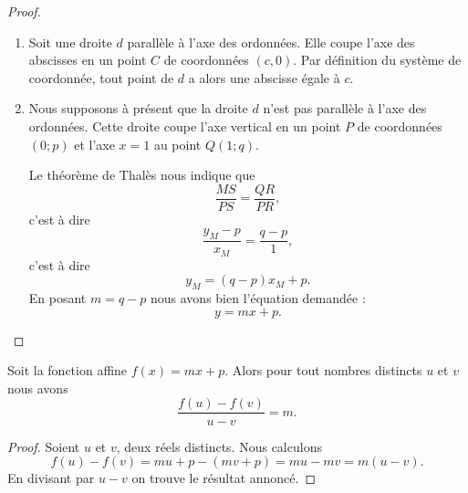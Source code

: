 \begin{proof}
    \begin{enumerate}
        \item
            Soit une droite \( d\) parallèle à l'axe des ordonnées. Elle coupe l'axe des abscisses en un point \( C\) de coordonnées \( (c,0)\). Par définition du système de coordonnée, tout point de \( d\) a alors une abscisse égale à \( c\).
        \item
            Nous supposons à présent que la droite \( d\) n'est pas parallèle à l'axe des ordonnées. Cette droite coupe l'axe vertical en un point \( P\) de coordonnées \( (0;p)\) et l'axe \( x=1\) au point \( Q(1;q)\).
            \begin{center}
   
            \end{center}
            Le théorème de Thalès nous indique que
            \begin{equation}
                \frac{ MS }{ PS }=\frac{ QR }{ PR },
            \end{equation}
            c'est à dire
            \begin{equation}
                \frac{ y_M-p }{ x_M }=\frac{ q-p }{ 1 },
            \end{equation}
            c'est à dire
            \begin{equation}
                y_M=(q-p)x_M+p.
            \end{equation}
            En posant \( m=q-p\) nous avons bien l'équation demandée :
            \begin{equation}
                y=mx+p.
            \end{equation}
    \end{enumerate}
\end{proof}

\begin{theorem}
    Soit la fonction affine \( f(x)=mx+p\). Alors pour tout nombres distincts \( u\) et \( v\) nous avons
    \begin{equation}
        \frac{ f(u)-f(v) }{ u-v }=m.
    \end{equation}
\end{theorem}

\begin{proof}
    Soient \( u\) et \( v\), deux réels distincts. Nous calculons
    \begin{equation}
        f(u)-f(v)=mu+p-(mv+p)=mu-mv=m(u-v).
    \end{equation}
    En divisant par \( u-v\) on trouve le résultat annoncé.
\end{proof}


